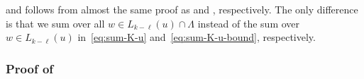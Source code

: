 \documentclass[11pt]{amsart}
\def\+#1{\mathcal{#1}}
\newcommand{\abs}[1]{\ensuremath{\left\vert#1\right\vert}}
\theoremstyle{definition}
\theoremstyle{remark}
\begin{document}
 and  follows from almost the same proof as  and , respectively. The only difference is that we sum over all $w \in L_{k-\ell}(u) \cap \Lambda$ instead of the sum over $w \in L_{k-\ell}(u)$ in~\eqref{eq:sum-K-u} and~\eqref{eq:sum-K-u-bound}, respectively.






\subsubsection{Proof of }
\end{document}
